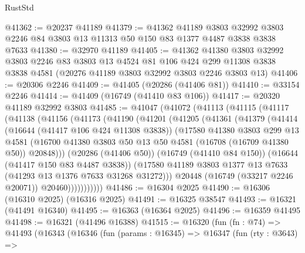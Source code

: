 \begin{lexlean}{RustStd}
\begin{coremodule}
@41362 := @20237 @41189
@41379 := @41362
    @41189
    @3803
    @32992
    @3803
    @2246
    @84
    @3803
    @13
    @11313
    @50
    @150
    @83
    @1377
    @4487
    @3838
    @3838
    @7633
@41380 := @32970 @41189
@41405 := @41362
    @41380
    @3803
    @32992
    @3803
    @2246
    @83
    @3803
    @13
    @4524
    @81
    @106
    @424
    @299
    @11308
    @3838
    @3838
    @4581
    (@20276 @41189 @3803 @32992 @3803 @2246 @3803 @13)
@41406 := @20306 @2246
@41409 := @41405 (@20286 (@41406 @81))
@41410 := @33154 @2246
@41414 := @41409 (@16749 (@41410 @83 @106))
@41417 := @20320 @41189 @32992 @3803
@41485 := @41047
    (@41072
      (@41113
        (@41115
          (@41117
            (@41138
              (@41156
                (@41173
                  (@41190
                    (@41201
                      (@41205
                        (@41361
                          (@41379
                            (@41414
                              (@16644 (@41417 @106 @424 @11308 @3838))
                              (@17580
                                @41380
                                @3803
                                @299
                                @13
                                @4581
                                (@16700
                                  @41380
                                  @3803
                                  @50
                                  @13
                                  @50
                                  @4581
                                  (@16708 (@16709 @41380 @50))
                                  @20848)))
                            (@20286 (@41406 @50))
                            (@16749 (@41410 @84 @150))
                            (@16644 (@41417 @150 @83 @4487 @3838))
                            (@17580
                              @41189
                              @3803
                              @1377
                              @13
                              @7633
                              (@41293 @13 @1376 @7633 @31268 @31272)))
                          @20448
                          (@16749 (@33217 @2246 @20071))
                          @20460)))))))))))
@41486 := @16304 @2025
@41490 := @16306 (@16310 @2025) (@16316 @2025)
@41491 := @16325 @38547
@41493 := @16321 (@41491 @16340)
@41495 := @16363 (@16364 @2025)
@41496 := @16359 @41495
@41498 := @16321 (@41496 @16388)
@41515 := @16320
    (fun (fn : @74) =>
    @41493
      (@16343
        (@16346
          (fun (params : @16345) =>
          @16347
            (fun (rty : @3643) =>

\end{coremodule}
\end{lexlean}
